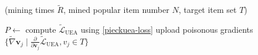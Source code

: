 \begin{algorithm}
\caption{\modelII{} (mining times $\tilde{R}$, mined popular item number $N$, target item set ${T}$)}
\label{alg:pieckuea}
\begin{algorithmic}[1]
\State ${P} \gets$  
    \State compute $\tilde{\mathcal{L}}_\text{UEA}$ using \cref{pieckuea-loss}
    \State upload poisonous gradients $\{ \tilde{\nabla}{\mathbf{v}}_j \mid \frac{\partial}{\partial \mathbf{v}_j} \tilde{\mathcal{L}}_\text{UEA}, v_j \in {T} \}$
\EndWhile
\end{algorithmic}
\end{algorithm}
